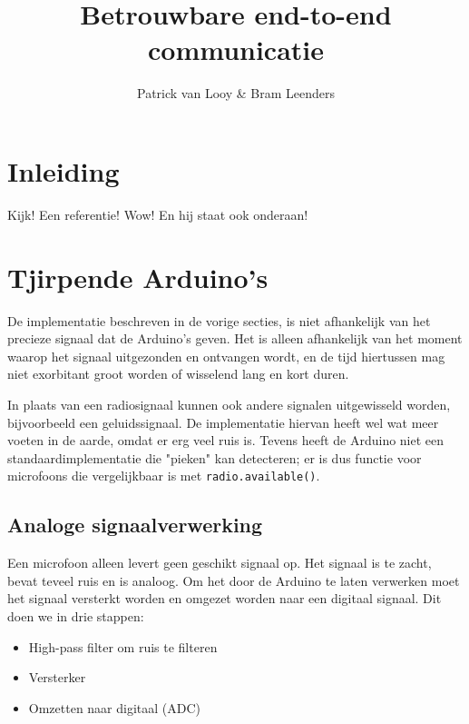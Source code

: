 \documentclass[a4paper,10pt]{article}
\title{Betrouwbare end-to-end communicatie}
\author{Patrick van Looy \& Bram Leenders}
\begin{document}
\maketitle

\section{Inleiding}
Kijk! Een referentie! \cite{sundararaman2005clock} Wow! En hij staat ook onderaan!


\section{Tjirpende Arduino's}
De implementatie beschreven in de vorige secties, is niet afhankelijk van het precieze signaal dat de Arduino's geven. Het is alleen afhankelijk van het moment waarop het signaal uitgezonden en ontvangen wordt, en de tijd hiertussen mag niet exorbitant groot worden of wisselend lang en kort duren.

In plaats van een radiosignaal kunnen ook andere signalen uitgewisseld worden, bijvoorbeeld een geluidssignaal. De implementatie hiervan heeft wel wat meer voeten in de aarde, omdat er erg veel ruis is. Tevens heeft de Arduino niet een standaardimplementatie die "pieken" kan detecteren; er is dus functie voor microfoons die vergelijkbaar is met \texttt{radio.available()}.

\subsection{Analoge signaalverwerking}
Een microfoon alleen levert geen geschikt signaal op. Het signaal is te zacht, bevat teveel ruis en is analoog. Om het door de Arduino te laten verwerken moet het signaal versterkt worden en omgezet worden naar een digitaal signaal. Dit doen we in drie stappen:


\begin{itemize}
	\item High-pass filter om ruis te filteren
	\item Versterker
	\item Omzetten naar digitaal (ADC)
\end{itemize}
\end{document}
